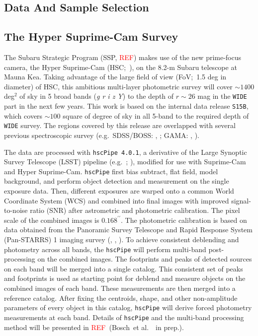 \documentclass[preprint]{aastex}
\def\arcsec{{\prime\prime}}
\def\etal{{\ et al.~}}
\newcommand{\addref}{{\textcolor{red}{REF}}}
\begin{document}
\begin{CJK*}{UTF8}{gbsn}

\section{Data And Sample Selection}

\subsection{The Hyper Suprime-Cam Survey}

    The Subaru Strategic Program (SSP, \addref) makes use of the new prime-focus camera,
    the Hyper Suprime-Cam (HSC;~\citealt{Miyazaki2012}), on the 8.2-m Subaru
    telescope at Mauna Kea.  
    Taking advantage of the large field of view (FoV;~1.5 deg in diameter) of HSC, this
    ambitious multi-layer photometric survey will cover $\sim 1400$ deg$^2$ of sky in 5
    broad bands (\textit{g r i z Y}) to the depth of $r \sim 26$ mag in the \texttt{WIDE}
    part in the next few years.  
    This work is based on the internal data release \texttt{S15B}, which covers $\sim 100$
    square of degree of sky in all 5-band to the required depth of \texttt{WIDE} survey.  
    The regions covered by this release are overlapped with several previous spectroscopic
    survey (e.g.\ SDSS/BOSS: \citealt{Eisenstein2011}, \citealt{Alam2015}; 
    GAMA: \citealt{Driver2011}, \citealt{Liske2015}).

    The data are processed with \texttt{hscPipe 4.0.1}, a derivative of the Large Synoptic
    Survey Telescope (LSST) pipeline (e.g.\ \citealt{Ivezic2008}; \citealt{Axelrod2010}),
    modified for use with Suprime-Cam and Hyper Suprime-Cam.  
    \texttt{hscPipe} first bias subtract, flat field, model background, and perform object
    detection and measurement on the single exposure data. 
    Then, different exposures are warped onto a common World Coordinate System (WCS) and
    combined into final images with improved signal-to-noise ratio (SNR) after astrometric
    and photometric calibration.  
    The pixel scale of the combined images is $0.168^{\arcsec}$.  
    The photometric calibration is based on data obtained from the Panoramic Survey 
    Telescope and Rapid Response System (Pan-STARRS) 1 imaging survey 
    (\citealt{Schlafly2012}, \citealt{Tonry2012}, \citealt{Magnier2013}). 
    To achieve consistent deblending and photometry across all bands, the \texttt{hscPipe}
    will perform multi-band post-processing on the combined images.  
    The footprints and peaks of detected sources on each band will be merged into a single
    catalog.    
    This consistent set of peaks and footprints is used as starting point for deblend and
    measure objects on the combined images of each band.  
    These measurements are then merged into a reference catalog.  After fixing the
    centroids, shape, and other non-amplitude parameters of every object in this catalog,
    \texttt{hscPipe} will derive forced photometry measurements at each band. 
    Details of \texttt{hscPipe} and the multi-band processing method will be presented in
    \addref~(Bosch\etal~in prep.).     
          

\end{CJK*}
\end{document}
